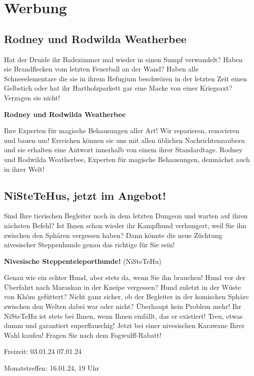 \documentclass[final]{multiversum}
\begin{document}
\section{Werbung}
\subsection{Rodney und Rodwilda Weatherbee}
Hat der Druide ihr Badezimmer mal wieder in einen Sumpf verwandelt?  Haben sie
Brandflecken vom letzten Feuerball an der Wand? Haben alle Schneeelementare die
sie in ihrem Refugium beschwören in der letzten Zeit einen Gelbstich oder hat
ihr Hartholzparkett gar eine Macke von einer Kriegsaxt? Verzagen sie nicht!

\bigskip

\centerline{\textbf{Rodney und Rodwilda Weatherbee}}

\bigskip

Ihre Experten für magische Behausungen aller Art!
Wir reparieren, renovieren und bauen um!  Erreichen können sie uns mit allen
üblichen Nachrichtenzaubern und sie erhalten eine Antwort innerhalb von einem
ihrer Standardtage.  Rodney und Rodwilda Weatherbee, Experten für magische
Behausungen, demnächst auch in ihrer Welt!

\subsection{NiSteTeHus, jetzt im Angebot!}
Sind Ihre tierischen Begleiter noch in dem letzten Dungeon und warten auf ihren
nächsten Befehl?  Ist Ihnen schon wieder ihr Kampfhund verhungert, weil Sie ihn
zwischen den Sphären vergessen haben?  Dann könnte die neue Züchtung nivesischer
Steppenhunde genau das richtige für Sie sein!  

\bigskip

\centerline{\textbf{Nivesische Steppenteleporthunde!}
{\footnotesize(NiSteTeHu)}}

\bigskip

Genau wie ein echter Hund, aber stets da, wenn Sie ihn brauchen!
Hund vor der Überfahrt nach Maraskan in der Kneipe vergessen?  Hund zuletzt in
der Wüste von Khôm gefüttert?  Nicht ganz sicher, ob der Begleiter in der
komischen Sphäre zwischen den Welten dabei war oder nicht? Überhaupt kein
Problem mehr!  Ihr NiSteTeHu ist stets bei Ihnen, wenn Ihnen einfällt, das er
existiert!  Treu, etwas dumm und garantiert superflauschig!  Jetzt bei einer
nivesischen Karawane Ihrer Wahl kaufen! Fragen Sie nach dem Fogwulff-Rabatt!

\begin{termine}
\item Freizeit: 03.01.24 \textendash{} 07.01.24
\item Monatstreffen: 16.01.24, 19 Uhr
\end{termine}
\impressum
\end{document}
